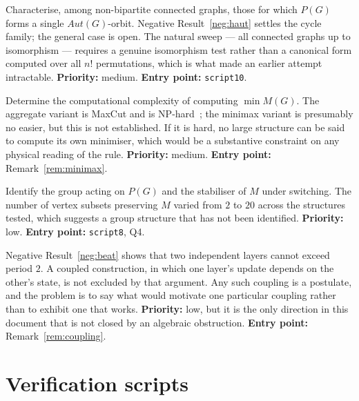 \documentclass[11pt,a4paper]{article}
\def\mathrm#1{#1}%
\def\mathcal#1{#1}%
\newcommand{\Aut}{\mathrm{Aut}}
\begin{document}
\begin{openprobbox}
Characterise, among non-bipartite connected graphs, those for which $\mathcal{P}(G)$ forms a single $\Aut(G)$-orbit. Negative Result~\ref{neg:haut} settles the cycle family; the general case is open. The natural sweep --- all connected graphs up to isomorphism --- requires a genuine isomorphism test rather than a canonical form computed over all $n!$ permutations, which is what made an earlier attempt intractable. \textbf{Priority:} medium. \textbf{Entry point:} \texttt{script10}.
\end{openprobbox}

\begin{openprobbox}
Determine the computational complexity of computing $\min M(G)$. The aggregate variant is MaxCut and is NP-hard~\citep{Karp1972}; the minimax variant is presumably no easier, but this is not established. If it is hard, no large structure can be said to compute its own minimiser, which would be a substantive constraint on any physical reading of the rule. \textbf{Priority:} medium. \textbf{Entry point:} Remark~\ref{rem:minimax}.
\end{openprobbox}

\begin{openprobbox}
Identify the group acting on $\mathcal{P}(G)$ and the stabiliser of $M$ under switching. The number of vertex subsets preserving $M$ varied from $2$ to $20$ across the structures tested, which suggests a group structure that has not been identified. \textbf{Priority:} low. \textbf{Entry point:} \texttt{script8}, Q4.
\end{openprobbox}

\begin{openprobbox}
Negative Result~\ref{neg:beat} shows that two independent layers cannot exceed period $2$. A coupled construction, in which one layer's update depends on the other's state, is not excluded by that argument. Any such coupling is a postulate, and the problem is to say what would motivate one particular coupling rather than to exhibit one that works. \textbf{Priority:} low, but it is the only direction in this document that is not closed by an algebraic obstruction. \textbf{Entry point:} Remark~\ref{rem:coupling}.
\end{openprobbox}

\section{Verification scripts}
\label{sec:scripts}
\end{document}
